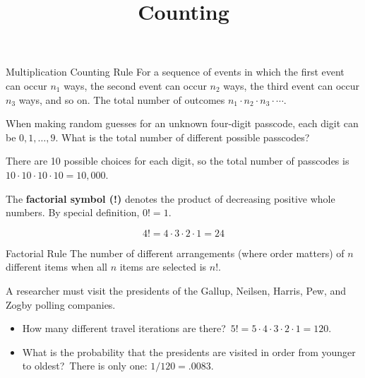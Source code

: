 \documentclass{beamer}
\title[MA205 - Section 4.4]{Counting}
\begin{document}
\begin{frame}
\titlepage
\end{frame}

\begin{frame}
\begin{block}{Multiplication Counting Rule}
For a sequence of events in which the first event can occur $n_1$ ways, the second event can occur $n_2$ ways, the third event can occur $n_3$ ways, and so on. The total number of outcomes $n_1\cdot n_2\cdot n_3\cdot\cdots$.
\end{block}\pause

\begin{example}
When making random guesses for an unknown four-digit passcode, each digit can be $0,1,\ldots,9$. What is the total number of different possible passcodes?\pause

\vspace{1mm}
There are 10 possible choices for each digit, so the total number of passcodes is $10\cdot 10\cdot 10\cdot 10 = 10,000$.
\end{example}
\end{frame}

\begin{frame}
\begin{definition}
The \textbf{factorial symbol (!)} denotes the product of decreasing positive whole numbers. By special definition, $0!=1$.
\end{definition}\pause

\begin{example}
\vspace{-3mm}
\begin{equation*}
4!=4\cdot3\cdot2\cdot1=24
\end{equation*}
\end{example}\pause

\begin{block}{Factorial Rule}
The number of different arrangements (where order matters) of $n$ different items when all $n$ items are selected is $n!$. %
\end{block}\pause

\begin{example}
A researcher must visit the presidents of the Gallup, Neilsen, Harris, Pew, and Zogby polling companies.
\begin{itemize}
\item How many different travel iterations are there?\pause\ $5!=5\cdot4\cdot3\cdot2\cdot1=120$.\pause
\item What is the probability that the presidents are visited in order from younger to oldest?\pause~There is only one: $1/120=.0083$.
\end{itemize}
\end{example}
\end{frame}
\end{document}
